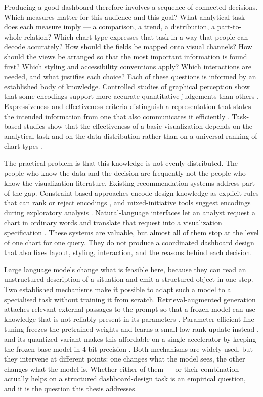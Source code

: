 Producing a good dashboard therefore involves a sequence of connected decisions. Which measures matter for this audience and this goal? What analytical task does each measure imply --- a comparison, a trend, a distribution, a part-to-whole relation? Which chart type expresses that task in a way that people can decode accurately? How should the fields be mapped onto visual channels? How should the views be arranged so that the most important information is found first? Which styling and accessibility conventions apply? Which interactions are needed, and what justifies each choice? Each of these questions is informed by an established body of knowledge. Controlled studies of graphical perception show that some encodings support more accurate quantitative judgements than others \cite{cleveland1984graphical}. Expressiveness and effectiveness criteria distinguish a representation that states the intended information from one that also communicates it efficiently \cite{mackinlay1986apt}. Task-based studies show that the effectiveness of a basic visualization depends on the analytical task and on the data distribution rather than on a universal ranking of chart types \cite{saket2019taskbased,kim2018taskdata}.

The practical problem is that this knowledge is not evenly distributed. The people who know the data and the decision are frequently not the people who know the visualization literature. Existing recommendation systems address part of the gap. Constraint-based approaches encode design knowledge as explicit rules that can rank or reject encodings \cite{moritz2019draco}, and mixed-initiative tools suggest encodings during exploratory analysis \cite{wongsuphasawat2016voyager,wongsuphasawat2017voyager2}. Natural-language interfaces let an analyst request a chart in ordinary words and translate that request into a visualization specification \cite{narechania2021nl4dv,luo2022nmt}. These systems are valuable, but almost all of them stop at the level of one chart for one query. They do not produce a coordinated dashboard design that also fixes layout, styling, interaction, and the reasons behind each decision.

Large language models change what is feasible here, because they can read an unstructured description of a situation and emit a structured object in one step. Two established mechanisms make it possible to adapt such a model to a specialised task without training it from scratch. Retrieval-augmented generation attaches relevant external passages to the prompt so that a frozen model can use knowledge that is not reliably present in its parameters \cite{lewis2020rag}. Parameter-efficient fine-tuning freezes the pretrained weights and learns a small low-rank update instead \cite{hu2022lora}, and its quantized variant makes this affordable on a single accelerator by keeping the frozen base model in 4-bit precision \cite{dettmers2023qlora}. Both mechanisms are widely used, but they intervene at different points: one changes what the model sees, the other changes what the model is. Whether either of them --- or their combination --- actually helps on a structured dashboard-design task is an empirical question, and it is the question this thesis addresses.

